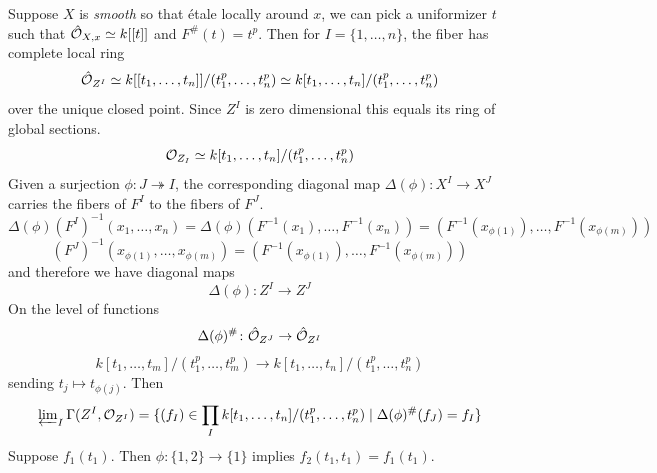 \documentclass[12pt]{article}
\begin{document}
Suppose $X$ is \textit{smooth} so that \'etale locally around $x$, we can pick a uniformizer $t$ such that $\hat{\mathcal{O}}_{X,x}\simeq k[[t]]$ and $F^{\#}(t) = t^p$. Then for $I = \{1,\ldots,n\}$, the fiber has complete local ring 
\[\hat{\mathcal{O}}_{Z^I} \simeq k[[t_1,\ldots,t_n]]/(t_1^p, \ldots,t_n^p) 
\simeq k[t_1,\ldots,t_n]/(t_1^p, \ldots, t_n^p)\]
over the unique closed point. Since $Z^I$ is zero dimensional this equals its ring of global sections.
\[\mathcal{O}_{Z_I} \simeq k[t_1,\ldots,t_n]/(t_1^p, \ldots, t_n^p)\]
Given a surjection $\phi \colon J \twoheadrightarrow I$, the corresponding diagonal map $\Delta(\phi) \colon X^I \to X^J$ carries the fibers of $F^I$ to the fibers of $F^J$.
\[\Delta(\phi)(F^I)^{-1}(x_1,\ldots,x_n) = \Delta(\phi)(F^{-1}(x_1),\ldots,F^{-1}(x_n)) = (F^{-1}(x_{\phi(1)}), \ldots, F^{-1}(x_{\phi(m)}))\]
\[(F^J)^{-1}(x_{\phi(1)}, \ldots, x_{\phi(m)}) = (F^{-1}(x_{\phi(1)}), \ldots, F^{-1}(x_{\phi(m)}))\]
and therefore we have diagonal maps
\[\Delta(\phi) \colon Z^I \to Z^J\]
On the level of functions
\[\Delta(\phi)^{\#} \colon \hat{\mathcal{O}}_{Z^J} \to \hat{\mathcal{O}}_{Z^I}\]
\[ k[t_1,\ldots,t_m]/(t_1^p, \ldots,t_m^p) \to  k[t_1,\ldots,t_n]/(t_1^p, \ldots,t_n^p)\]
sending $t_j \mapsto t_{\phi(j)}$. Then
\[\varprojlim\nolimits_I \Gamma(Z^I, \mathcal{O}_{Z^I}) = \{(f_I) \in \prod_{I} k[t_1,\ldots,t_n]/(t_1^p, \ldots, t_n^p) \mid \Delta(\phi)^{\#}(f_J) = f_I\}\]
Suppose $f_1(t_1)$. Then $\phi \colon \{1,2\} \to \{1\}$ implies $f_2(t_1,t_1) = f_1(t_1)$. 


\newpage

\printbibliography
\end{document}
